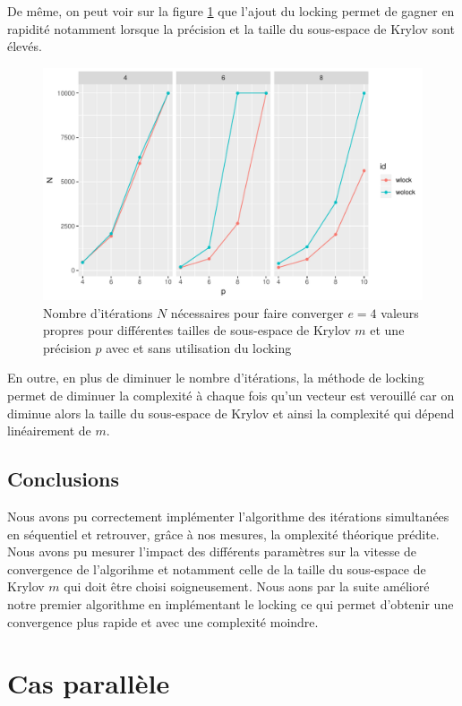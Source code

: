 \documentclass[11pt,a4paper]{article}
\begin{document}
		De même, on peut voir sur la figure \ref{fig:Nvsp_complock} que l'ajout du locking permet de gagner en rapidité notamment lorsque la précision et la taille du sous-espace de Krylov sont élevés.

		\begin{figure}
			\centering
			\includegraphics[width=0.8\linewidth, keepaspectratio]{plots/Nvsp_complock.pdf}
			\caption{Nombre d'itérations $N$ nécessaires pour faire converger $e = 4$ valeurs propres pour différentes tailles de sous-espace de Krylov $m$ et une précision $p$ avec et sans utilisation du locking \label{fig:Nvsp_complock}}
		\end{figure}

		En outre, en plus de diminuer le nombre d'itérations, la méthode de locking permet de diminuer la complexité à chaque fois qu'un vecteur est verouillé car on diminue alors la taille du sous-espace de Krylov et ainsi la complexité qui dépend linéairement de $m$.

	\subsection{Conclusions}
		Nous avons pu correctement implémenter l'algorithme des itérations simultanées en séquentiel et retrouver, grâce à nos mesures, la omplexité théorique prédite. Nous avons pu mesurer l'impact des différents paramètres sur la vitesse de convergence de l'algorihme et notamment celle de la taille du sous-espace de Krylov $m$ qui doit être choisi soigneusement. Nous aons par la suite amélioré notre premier algorithme en implémentant le locking ce qui permet d'obtenir une convergence plus rapide et avec une complexité moindre.
		
\section{Cas parallèle}
\end{document}

